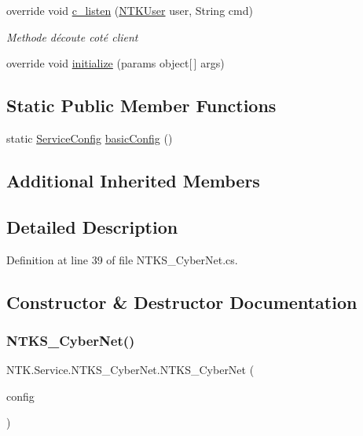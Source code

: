\begin{DoxyCompactItemize}
override void \mbox{\hyperlink{class_n_t_k_1_1_service_1_1_n_t_k_s___cyber_net_ac70faa17037f8ac3fab6f6a4481075ac}{c\+\_\+listen}} (\mbox{\hyperlink{class_n_t_k_1_1_n_t_k_user}{N\+T\+K\+User}} user, String cmd)
\begin{DoxyCompactList}\small\item\em Methode d\textquotesingle{}écoute coté client \end{DoxyCompactList}\item 
override void \mbox{\hyperlink{class_n_t_k_1_1_service_1_1_n_t_k_s___cyber_net_aa3cfe3683212d5938bf1e6d0dab4b8c2}{initialize}} (params object\mbox{[}$\,$\mbox{]} args)
\end{DoxyCompactItemize}
\subsection*{Static Public Member Functions}
\begin{DoxyCompactItemize}
\item 
static \mbox{\hyperlink{struct_n_t_k_1_1_service_1_1_service_config}{Service\+Config}} \mbox{\hyperlink{class_n_t_k_1_1_service_1_1_n_t_k_s___cyber_net_abc23d461eb122a3ce67eb00c2e4ebea9}{basic\+Config}} ()
\end{DoxyCompactItemize}
\subsection*{Additional Inherited Members}


\subsection{Detailed Description}


Definition at line 39 of file N\+T\+K\+S\+\_\+\+Cyber\+Net.\+cs.



\subsection{Constructor \& Destructor Documentation}
\mbox{\label{class_n_t_k_1_1_service_1_1_n_t_k_s___cyber_net_a29df9eabbc2e3e1ff3d4078e7c198edd}} 
\subsubsection{\texorpdfstring{NTKS\_CyberNet()}{NTKS\_CyberNet()}\hspace{0.1cm}{\footnotesize\ttfamily [1/3]}}
{\footnotesize\ttfamily N\+T\+K.\+Service.\+N\+T\+K\+S\+\_\+\+Cyber\+Net.\+N\+T\+K\+S\+\_\+\+Cyber\+Net (\begin{DoxyParamCaption}\item[{\mbox{\hyperlink{struct_n_t_k_1_1_service_1_1_service_config}{Service\+Config}}}]{config }\end{DoxyParamCaption})}



